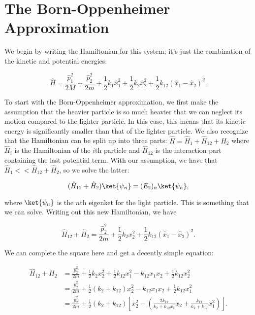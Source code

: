 \section{The Born-Oppenheimer Approximation}

We begin by writing the Hamiltonian for this system; it's just the combination of the kinetic and potential energies:

\begin{equation}
  \hat{H} = \frac{\hat{p}_1^2}{2M} + \frac{\hat{p}_2^2}{2m} + \frac{1}{2}k_1\hat{x}_1^2 + \frac{1}{2}k_2\hat{x}_2^2 + \frac{1}{2}k_{12}(\hat{x}_1 - \hat{x}_2)^2.
\end{equation}

To start with the Born-Oppenheimer approximation, we first make the assumption that the heavier particle is so much heavier that we can neglect its motion compared to the lighter particle. In this case, this means that its kinetic energy is significantly smaller than that of the lighter particle. We also recognize that the Hamiltonian can be split up into three parts: $\hat{H} = \hat{H}_1 + \hat{H}_{12} + \hat{H}_{2}$ where $\hat{H}_i$ is the Hamiltonian of the $i$th particle and $\hat{H}_{12}$ is the interaction part containing the last potential term. With our assumption, we have that $\hat{H}_1 << \hat{H}_{12} + \hat{H}_2$, so we solve the latter:

\begin{equation}
  (\hat{H}_{12} + \hat{H}_2)\ket{\psi_n} = (E_2)_n\ket{\psi_n},
\end{equation}

where $\ket{\psi_n}$ is the $n$th eigenket for the light particle. This is something that we can solve. Writing out this new Hamiltonian, we have

\begin{equation}
  \hat{H}_{12} + \hat{H}_2 = \frac{\hat{p}_2^2}{2m} + \frac{1}{2}k_2x_2^2 + \frac{1}{2}k_{12}(\hat{x}_1 - \hat{x}_2)^2.
\end{equation}

We can complete the square here and get a decently simple equation:

\begin{align}
  \hat{H}_{12} + \hat{H}_2 &= \frac{\hat{p}_2^2}{2m} + \frac{1}{2}k_2x_2^2 + \frac{1}{2}k_{12}x_1^2 - k_{12}x_1x_2 + \frac{1}{2}k_{12}x_2^2 \\
                           &= \frac{\hat{p}_2^2}{2m} + \frac{1}{2}(k_2 + k_{12})x_2^2 - k_{12}x_1x_2 + \frac{1}{2}k_{12}x_1^2 \\
                           &= \frac{\hat{p}_2^2}{2m} + \frac{1}{2}(k_2 + k_{12})\left[ x_2^2 - \left( \frac{2k_{12}}{k_2 + k_{12} x_1}x_2 + \frac{k_{12}}{k_2 + k_12}x_1^2 \right) \right].
\end{align}

